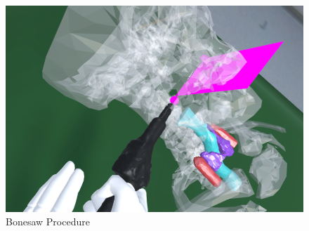 \begin{figure}[ht!]
    \centering
    \includegraphics[width=\linewidth]{images/implementation/features/procedures/bonesaw.png}
    \caption{\label{fig::FeatureBoneSaw} Bonesaw Procedure}
\end{figure}